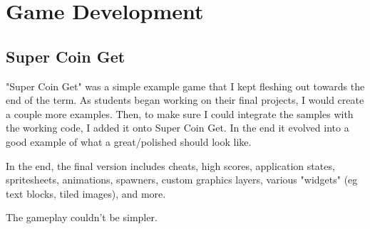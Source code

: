 \chapter{Game Development}

\section{Super Coin Get}
"Super Coin Get" was a simple example game that I kept fleshing out
towards the end of the term. As students began working on their final
projects, I would create a couple more examples. Then, to make sure
I could integrate the samples with the working code, I added it onto
Super Coin Get. In the end it evolved into a good example of what a
great/polished should look like.

In the end, the final version includes cheats, high scores, application
states, spritesheets, animations, spawners, custom graphics layers,
various "widgets" (eg text blocks, tiled images), and more.

The gameplay couldn't be simpler.


%
%
%
%
